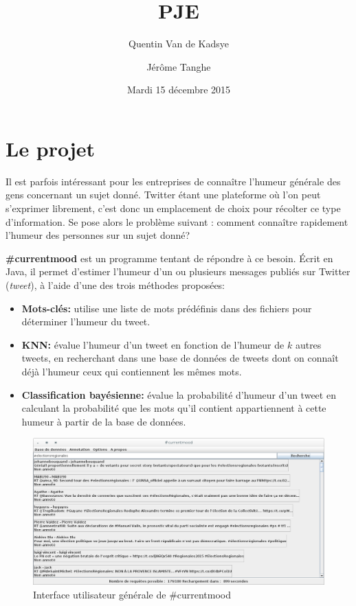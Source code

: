 \documentclass[12pt,a4paper]{report}
\title{PJE\\\CMName}
\author{Quentin Van de Kadsye \and Jérôme Tanghe}
\date{Mardi 15 décembre 2015}
\newcommand{\CMName}{\#currentmood}
\begin{document}
\maketitle

\tableofcontents


\chapter{Le projet}

Il est parfois intéressant pour les entreprises de connaître l'humeur générale
des gens concernant un sujet donné. Twitter étant une plateforme où l'on peut
s'exprimer librement, c'est donc un emplacement de choix pour récolter ce type
d'information. Se pose alors le problème suivant : comment connaître rapidement
l'humeur des personnes sur un sujet donné?

\textbf{\CMName} est un programme tentant de répondre à ce besoin. Écrit
en Java, il permet d'estimer l'humeur d'un ou plusieurs messages publiés sur
Twitter (\textit{tweet}), à l'aide d'une des trois méthodes proposées:

\begin{itemize}
	\item
		\textbf{Mots-clés:} utilise une liste de mots prédéfinis dans des
		fichiers pour déterminer l'humeur du tweet.
	\item
		\textbf{KNN:} évalue l'humeur d'un tweet en fonction de l'humeur de $k$
		autres tweets, en recherchant dans une base de données de tweets dont on
		connaît déjà l'humeur ceux qui contiennent les mêmes mots.
	\item
		\textbf{Classification bayésienne:} évalue la probabilité d'humeur d'un
		tweet en calculant la probabilité que les mots qu'il contient
		appartiennent à cette humeur à partir de la base de données.
\end{itemize}

\begin{figure}[h]
	\includegraphics[width=\textwidth]{img/capture-currentmood-ui.png}
	\caption{Interface utilisateur générale de \CMName}
	\label{cm_ui}
\end{figure}
\end{document}
